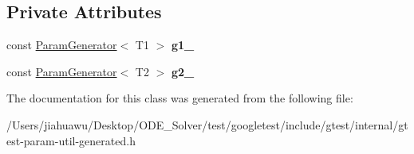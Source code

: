 \subsection*{Private Attributes}
\begin{DoxyCompactItemize}
\item 
\mbox{\label{classtesting_1_1internal_1_1_cartesian_product_generator2_a867afe39e21d3b9474c029f68efc0b1b}} 
const \mbox{\hyperlink{classtesting_1_1internal_1_1_param_generator}{Param\+Generator}}$<$ T1 $>$ {\bfseries g1\+\_\+}
\item 
\mbox{\label{classtesting_1_1internal_1_1_cartesian_product_generator2_abc38eec7b0ca7ecbd0c3038b67397460}} 
const \mbox{\hyperlink{classtesting_1_1internal_1_1_param_generator}{Param\+Generator}}$<$ T2 $>$ {\bfseries g2\+\_\+}
\end{DoxyCompactItemize}


The documentation for this class was generated from the following file\+:\begin{DoxyCompactItemize}
\item 
/\+Users/jiahuawu/\+Desktop/\+O\+D\+E\+\_\+\+Solver/test/googletest/include/gtest/internal/gtest-\/param-\/util-\/generated.\+h\end{DoxyCompactItemize}
